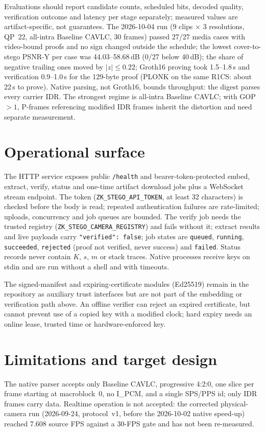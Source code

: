 \documentclass[11pt,a4paper]{article}
\theoremstyle{definition}
\theoremstyle{remark}
\begin{document}
Evaluations should report candidate counts, scheduled bits, decoded quality,
verification outcome and latency per stage separately; measured values are
artifact-specific, not guarantees. The 2026-10-04 run (9 clips $\times$ 3
resolutions, QP~22, all-intra Baseline CAVLC, 30 frames) passed 27/27 media
cases with video-bound proofs and no sign changed outside the schedule; the
lowest cover-to-stego PSNR-Y per case was 44.03--58.68\,dB (0/27 below 40\,dB);
the share of negative trailing ones moved by $|z|\le0.22$; Groth16 proving took
1.5--1.8\,s and verification 0.9--1.0\,s for the 129-byte proof (PLONK on the
same R1CS: about 22\,s to prove). Native parsing, not Groth16, bounds
throughput: the digest parses every carrier IDR. The strongest regime is
all-intra Baseline CAVLC; with GOP${}>1$, P-frames referencing modified IDR
frames inherit the distortion and need separate measurement.

\section{Operational surface}
The HTTP service exposes public \texttt{/health} and bearer-token-protected
embed, extract, verify, status and one-time artifact download jobs plus a
WebSocket stream endpoint. The token (\texttt{ZK\_STEGO\_API\_TOKEN}, at least
32 characters) is checked before the body is read; repeated authentication
failures are rate-limited; uploads, concurrency and job queues are bounded.
The verify job needs the trusted registry (\texttt{ZK\_STEGO\_CAMERA\_REGISTRY})
and fails without it; extract results and live payloads carry
\texttt{"verified": false}; job states are \texttt{queued}, \texttt{running},
\texttt{succeeded}, \texttt{rejected} (proof not verified, never success) and
\texttt{failed}. Status records never contain $K$, $s$, $m$ or stack traces.
Native processes receive keys on stdin and are run without a shell and with
timeouts.

The signed-manifest and expiring-certificate modules (Ed25519) remain in the
repository as auxiliary trust interfaces but are not part of the embedding or
verification path above. An offline verifier can reject an expired
certificate, but cannot prevent use of a copied key with a modified clock; hard
expiry needs an online lease, trusted time or hardware-enforced key.

\section{Limitations and target design}
The native parser accepts only Baseline CAVLC, progressive 4:2:0, one slice
per frame starting at macroblock~0, no I\_PCM, and a single SPS/PPS id; only
IDR frames carry data. Realtime operation is not accepted: the corrected
physical-camera run (2026-09-24, protocol~v1, before the 2026-10-02 native
speed-up) reached 7.608 source FPS against a 30-FPS gate and has not been
re-measured.
\end{document}
